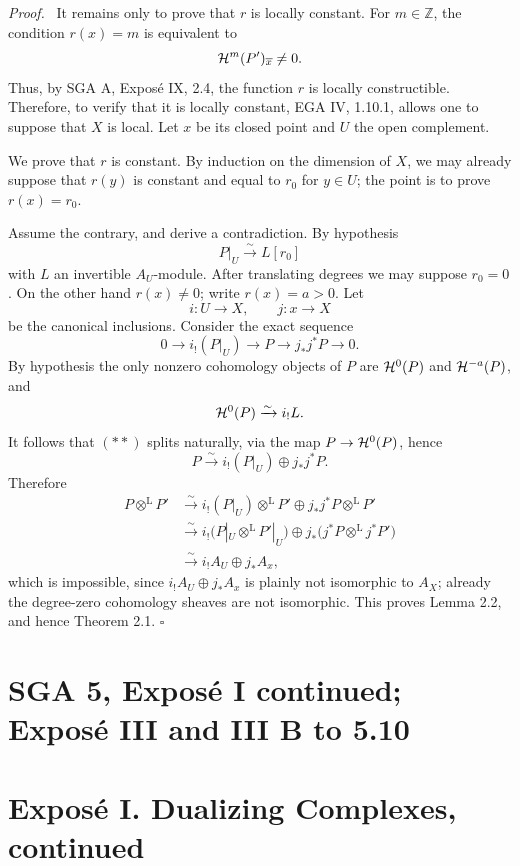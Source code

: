 \documentclass[11pt]{article}
\theoremstyle{plain}
\theoremstyle{definition}
\theoremstyle{remark}
\newenvironment{prooftext}{\par\noindent\textit{Proof.}\ }{\par\medskip}
\newcommand{\ZZ}{\mathbb Z}
\newcommand{\ol}[1]{\overline{#1}}
\newcommand{\qedtext}{\hfill$\square$}
\begin{document}
\begin{prooftext}
It remains only to prove that $r$ is locally constant. For $m\in\ZZ$, the condition $r(x)=m$ is equivalent to
\[
   \Hh^m(P')_{\ol{x}}\ne0.
\]
Thus, by SGA A, Exposé IX, 2.4, the function $r$ is locally constructible. Therefore, to verify that it is locally constant, EGA IV, 1.10.1, allows one to suppose that $X$ is local. Let $x$ be its closed point and $U$ the open complement.

We prove that $r$ is constant. By induction on the dimension of $X$, we may already suppose that $r(y)$ is constant and equal to $r_0$ for $y\in U$; the point is to prove $r(x)=r_0$.

Assume the contrary, and derive a contradiction. By hypothesis
\[
   P|_U\xrightarrow{\sim}L[r_0]
\]
with $L$ an invertible $A_U$-module. After translating degrees we may suppose $r_0=0$. On the other hand $r(x)\ne0$; write $r(x)=a>0$. Let
\[
   i:U\to X,
   \qquad
   j:x\to X
\]
be the canonical inclusions. Consider the exact sequence
\[
   0\longrightarrow i_!(P|_U)\longrightarrow P\longrightarrow j_*j^*P\longrightarrow0.\tag{**}
\]
By hypothesis the only nonzero cohomology objects of $P$ are $\mathcal H^0(P)$ and $\mathcal H^{-a}(P)$, and
\[
   \mathcal H^0(P)\xrightarrow{\sim}i_!L.
\]
It follows that $(**)$ splits naturally, via the map $P\to\mathcal H^0(P)$, hence
\[
   P\xrightarrow{\sim} i_!(P|_U)\oplus j_*j^*P.
\]
Therefore
\begin{align*}
P\otimes^{\mathrm L}P'
&\xrightarrow{\sim} i_!(P|_U)\otimes^{\mathrm L}P'
      \oplus j_*j^*P\otimes^{\mathrm L}P' \\
&\xrightarrow{\sim} i_!\bigl(P|_U\otimes^{\mathrm L}P'|_U\bigr)
      \oplus j_*\bigl(j^*P\otimes^{\mathrm L}j^*P'\bigr)\\
&\xrightarrow{\sim} i_!A_U\oplus j_*A_x,
\end{align*}
which is impossible, since $i_!A_U\oplus j_*A_x$ is plainly not isomorphic to $A_X$; already the degree-zero cohomology sheaves are not isomorphic. This proves Lemma 2.2, and hence Theorem 2.1. \qedtext
\end{prooftext}

\bigskip


\clearpage
\section*{SGA 5, Exposé I continued; Exposé III and III B to 5.10}

\section*{Exposé I. Dualizing Complexes, continued}
\end{document}
